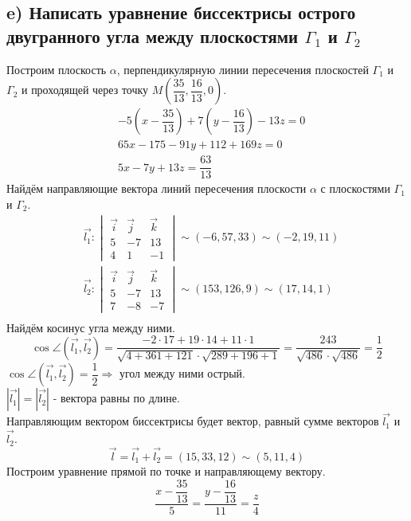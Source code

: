 \documentclass[12pt]{article}
\begin{document}
\begin{sloppypar}
    \subsection{e) Написать уравнение биссектрисы острого двугранного угла между плоскостями $\Gamma_1$ и $\Gamma_2$}
    Построим плоскость $\alpha$, перпендикулярную линии пересечения плоскостей $\Gamma_1$ и $\Gamma_2$ и проходящей через точку $M\left(\dfrac{35}{13}, \dfrac{16}{13}, 0\right)$.
    \begin{align*}
         & -5(x - \dfrac{35}{13}) + 7(y - \dfrac{16}{13}) - 13z = 0 \\
         & 65x - 175 - 91y + 112 + 169z = 0                         \\
         & 5x - 7y + 13z = \dfrac{63}{13}
    \end{align*}
    Найдём направляющие вектора линий пересечения плоскости $\alpha$ с плоскостями $\Gamma_1$ и $\Gamma_2$.
    \begin{align*}
         & \Vec{l_1}: \begin{vmatrix}
                          \vec i & \vec j & \vec k \\
                          5      & -7     & 13     \\
                          4      & 1      & -1
                      \end{vmatrix}
        \sim
        (-6, 57, 33)
        \sim
        (-2, 19, 11)                           \\
         & \Vec{l_2}: \begin{vmatrix}
                          \vec i & \vec j & \vec k \\
                          5      & -7     & 13     \\
                          7      & -8     & -7
                      \end{vmatrix}
        \sim
        (153, 126, 9)
        \sim
        (17, 14, 1)                            \\
    \end{align*}
    Найдём косинус угла между ними.
    \[
        \cos{\angle(\Vec{l_1}, \Vec{l_2})} = \dfrac{-2 \cdot 17 + 19 \cdot 14 + 11 \cdot 1}{\sqrt{4 + 361 + 121} \cdot \sqrt{289 + 196 + 1}} = \dfrac{243}{\sqrt{486} \cdot \sqrt{486}} = \dfrac{1}{2}
    \]
    $\cos{\angle(\Vec{l_1}, \Vec{l_2})} = \dfrac{1}{2} \Rightarrow$ угол между ними острый. \\
    $|\Vec{l_1}| = |\Vec{l_2}|$ - вектора равны по длине. \\
    Направляющим вектором биссектрисы будет вектор, равный сумме векторов $\Vec{l_1}$ и $\Vec{l_2}$.
    \[
        \Vec{l} = \Vec{l_1} + \Vec{l_2} = (15, 33, 12) \sim (5, 11, 4)
    \]
    Построим уравнение прямой по точке и направляющему вектору.
    \[
        \dfrac{x - \dfrac{35}{13}}{5} = \dfrac{y - \dfrac{16}{13}}{11} = \dfrac{z}{4}
    \]

\end{sloppypar}
\end{document}
